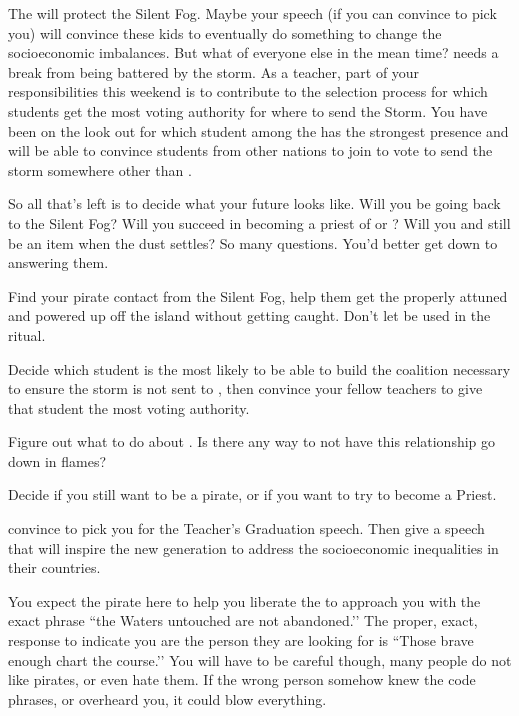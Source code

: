 \documentclass[char]{GL2020}
\begin{document}
The \iNet{} will protect the Silent Fog. Maybe your speech (if you can convince \cMusic{} to pick you) will convince these kids to eventually do something to change the socioeconomic imbalances. But what of everyone else in the mean time? \pShip{} needs a break from being battered by the storm. As a teacher, part of your responsibilities this weekend is to contribute to the selection process for which students get the most voting authority for where to send the Storm. You have been on the look out for which student among the \pShippies{} has the strongest presence and will be able to convince students from other nations to join to vote to send the storm somewhere other than \pShip{}.

So all that’s left is to decide what your future looks like. Will you be going back to the Silent Fog? Will you succeed in becoming a priest of \cEbb{} or \cFlow{}? Will you and \cPrince{} still be an item when the dust settles? So many questions. You’d better get down to answering them.

\begin{itemz}[Goals]
	\item Find your pirate contact from the Silent Fog, help them get the properly attuned and powered up \iNet{} off the island without getting caught. Don’t let \iNet{} be used in the ritual.
	\item Decide which \pShip{} student is the most likely to be able to build the coalition necessary to ensure the storm is not sent to \pShip{}, then convince your fellow teachers to give that student the most voting authority.
	\item Figure out what to do about \cPrince{}. Is there any way to not have this relationship go down in flames?
	\item Decide if you still want to be a pirate, or if you want to try to become a Priest.
	\item convince \cMusic{} to pick you for the Teacher’s Graduation speech. Then give a speech that will inspire the new generation to address the socioeconomic inequalities in their countries.
\end{itemz}

\begin{itemz}[Notes]
	\item You expect the pirate here to help you liberate the \iNet{} to approach you with the exact phrase ``the Waters untouched are not abandoned.’’ The proper, exact, response to indicate you are the person they are looking for is ``Those brave enough chart the course.’’ You will have to be careful though, many people do not like pirates, or even hate them. If the wrong person somehow knew the code phrases, or overheard you, it could blow everything.
\end{itemz}
\end{document}
